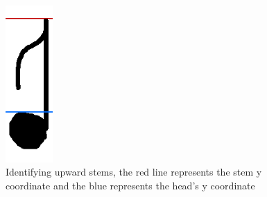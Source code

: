 \begin{figure}[h!]
    \quad
    \includegraphics[height=6cm]{gfx/techniques/scoring/note-stem-up/6111.png}

    \caption{Identifying upward stems, the red line represents the stem y  coordinate and the blue represents the head's y coordinate}
    \label{fig:downward-stem-identification}
\end{figure}

